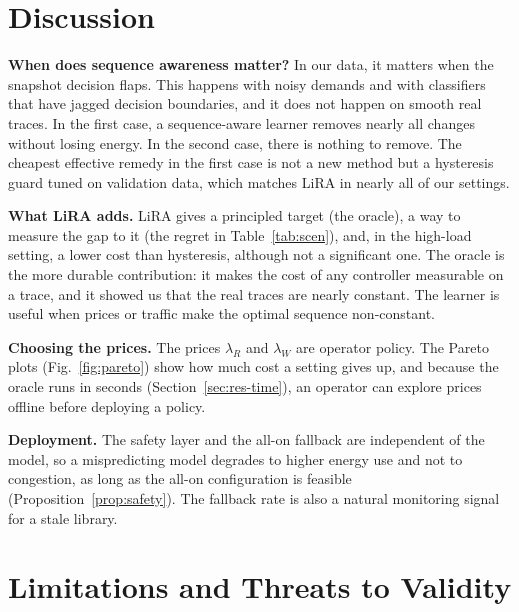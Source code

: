 \documentclass[journal]{IEEEtran}
\begin{document}
\section{Discussion}\label{sec:discussion}

\textbf{When does sequence awareness matter?} In our data, it matters when the snapshot decision flaps. This happens with noisy demands and with classifiers that have jagged decision boundaries, and it does not happen on smooth real traces. In the first case, a sequence-aware learner removes nearly all changes without losing energy. In the second case, there is nothing to remove. The cheapest effective remedy in the first case is not a new method but a hysteresis guard tuned on validation data, which matches LiRA in nearly all of our settings.

\textbf{What LiRA adds.} LiRA gives a principled target (the oracle), a way to measure the gap to it (the regret in Table~\ref{tab:scen}), and, in the high-load setting, a lower cost than hysteresis, although not a significant one. The oracle is the more durable contribution: it makes the cost of any controller measurable on a trace, and it showed us that the real traces are nearly constant. The learner is useful when prices or traffic make the optimal sequence non-constant.

\textbf{Choosing the prices.} The prices $\lambda_R$ and $\lambda_W$ are operator policy. The Pareto plots (Fig.~\ref{fig:pareto}) show how much cost a setting gives up, and because the oracle runs in seconds (Section~\ref{sec:res-time}), an operator can explore prices offline before deploying a policy.

\textbf{Deployment.} The safety layer and the all-on fallback are independent of the model, so a mispredicting model degrades to higher energy use and not to congestion, as long as the all-on configuration is feasible (Proposition~\ref{prop:safety}). The fallback rate is also a natural monitoring signal for a stale library.

\section{Limitations and Threats to Validity}\label{sec:limitations}
\end{document}
